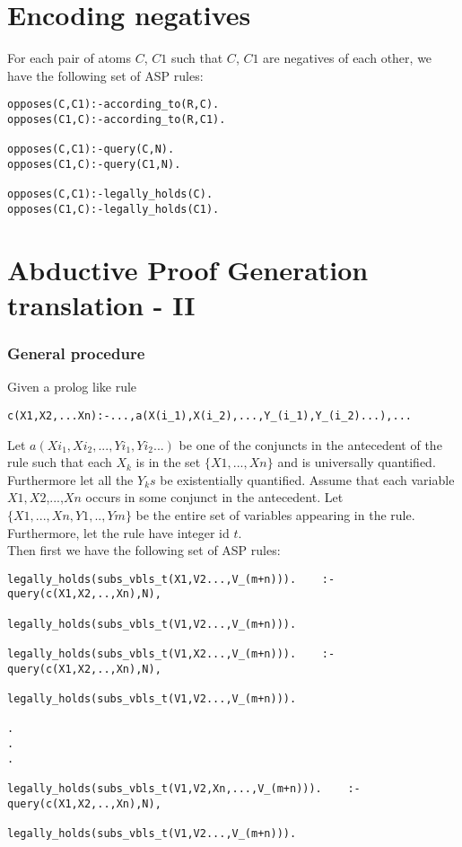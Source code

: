 \documentclass{article}
\begin{document}
\section{Encoding negatives}
For each pair of atoms $C$, $C1$ such that $C$, $C1$ are negatives of each other, we have the following set of ASP rules:
\begin{verbatim}
opposes(C,C1):-according_to(R,C).
opposes(C1,C):-according_to(R,C1).

opposes(C,C1):-query(C,N).
opposes(C1,C):-query(C1,N).

opposes(C,C1):-legally_holds(C).
opposes(C1,C):-legally_holds(C1).
\end{verbatim}

\section{Abductive Proof Generation translation - II}
\subsubsection{General procedure}
Given a prolog like rule 
\begin{verbatim}
c(X1,X2,...Xn):-...,a(X(i_1),X(i_2),...,Y_(i_1),Y_(i_2)...),...    
\end{verbatim}
Let $a(Xi_1,Xi_2,...,Yi_1,Yi_2...)$ be one of the conjuncts in the antecedent of the rule such that each $X_{k}$ is in the set $\{X1,...,Xn\}$ and is universally quantified. Furthermore let all the $Y_{k}s$ be existentially quantified. Assume that each variable $X1, X2$,...,$Xn$ occurs in some conjunct in the antecedent. Let $\{X1,...,Xn,Y1,..,Ym\}$ be the entire set of variables appearing in the rule. Furthermore, let the rule have integer id $t$.\\
\newline
Then first we have the following set of ASP rules:
\begin{verbatim}
legally_holds(subs_vbls_t(X1,V2...,V_(m+n))).    :-query(c(X1,X2,..,Xn),N),
                                 legally_holds(subs_vbls_t(V1,V2...,V_(m+n))). 

legally_holds(subs_vbls_t(V1,X2...,V_(m+n))).    :-query(c(X1,X2,..,Xn),N),
                               legally_holds(subs_vbls_t(V1,V2...,V_(m+n))).  

.
.
.

legally_holds(subs_vbls_t(V1,V2,Xn,...,V_(m+n))).    :-query(c(X1,X2,..,Xn),N),
                               legally_holds(subs_vbls_t(V1,V2...,V_(m+n))).  
\end{verbatim}
\end{document}
